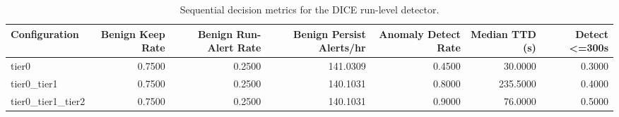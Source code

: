 \begin{table}[t]
\centering
\caption{Sequential decision metrics for the DICE run-level detector.}
\label{tab:dice_sequential_metrics}
\footnotesize
\begin{tabular}{lrrrrrr}
\toprule
Configuration & Benign Keep Rate & Benign Run-Alert Rate & Benign Persist Alerts/hr & Anomaly Detect Rate & Median TTD (s) & Detect <=300s \\
\midrule
tier0 & 0.7500 & 0.2500 & 141.0309 & 0.4500 & 30.0000 & 0.3000 \\
tier0_tier1 & 0.7500 & 0.2500 & 140.1031 & 0.8000 & 235.5000 & 0.4000 \\
tier0_tier1_tier2 & 0.7500 & 0.2500 & 140.1031 & 0.9000 & 76.0000 & 0.5000 \\
\bottomrule
\end{tabular}

\end{table}
